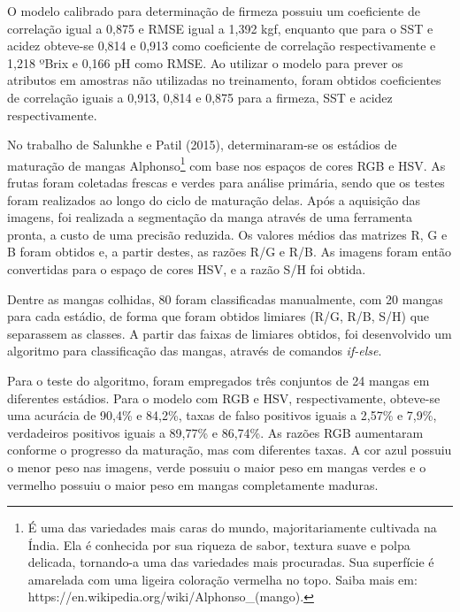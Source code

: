 O modelo calibrado para determinação de firmeza possuiu um coeficiente de correlação igual a 0,875 e RMSE igual a 1,392 kgf, enquanto que para o SST e acidez obteve-se 0,814 e 0,913 como coeficiente de correlação respectivamente e 1,218 ºBrix e 0,166 pH como RMSE. Ao utilizar o modelo para prever os atributos em amostras não utilizadas no treinamento, foram obtidos coeficientes de correlação iguais 	a 0,913, 0,814 e 0,875 para a firmeza, SST e acidez respectivamente. 

No trabalho de Salunkhe e Patil (2015), determinaram-se os estádios de maturação de mangas Alphonso\footnote{\label{ftnote:alphonso}É uma das variedades mais caras do mundo, majoritariamente cultivada na Índia. Ela é conhecida por sua riqueza de sabor, textura suave e polpa delicada, tornando-a uma das variedades mais procuradas. Sua superfície é amarelada com uma ligeira coloração vermelha no topo. Saiba mais em: https://en.wikipedia.org/wiki/Alphonso\_(mango).} com base nos espaços de cores RGB e HSV. As frutas foram coletadas frescas e verdes para análise primária, sendo que os testes foram realizados ao longo do ciclo de maturação delas. Após a aquisição das imagens, foi realizada a segmentação da manga através de uma ferramenta pronta, a custo de uma precisão reduzida. Os valores médios das matrizes R, G e B foram obtidos e, a partir destes, as razões R/G e R/B. As imagens foram então convertidas para o espaço de cores HSV, e a razão S/H foi obtida.

Dentre as mangas colhidas, 80 foram classificadas manualmente, com 20 mangas para cada estádio, de forma que foram obtidos limiares (R/G, R/B, S/H) que separassem as classes. A partir das faixas de limiares obtidos, foi desenvolvido um algoritmo para classificação das mangas, através de comandos \textit{if-else}.

Para o teste do algoritmo, foram empregados três conjuntos de 24 mangas em diferentes estádios. Para o modelo com RGB e HSV, respectivamente, obteve-se uma acurácia de 90,4\% e 84,2\%, taxas de falso positivos iguais a 2,57\% e 7,9\%, verdadeiros positivos iguais a 89,77\% e 86,74\%. As razões RGB aumentaram conforme o progresso da maturação, mas com diferentes taxas. A cor azul possuiu o menor peso nas imagens, verde possuiu o maior peso em mangas verdes e o vermelho possuiu o maior peso em mangas completamente maduras.

